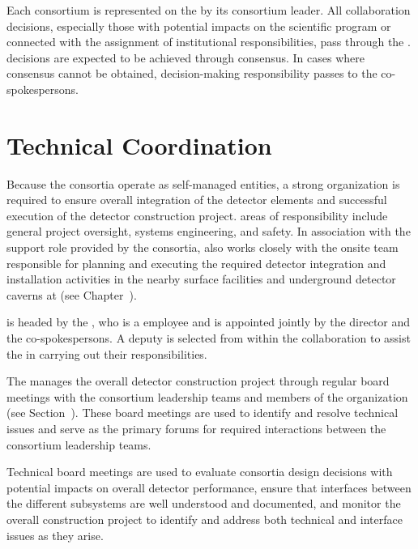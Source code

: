 Each consortium is represented on the   by its 
consortium leader.  All collaboration decisions, especially those with potential 
impacts on the  scientific program or connected with the assignment 
of institutional responsibilities, pass through the .   
decisions are expected to be achieved through consensus.  In cases where consensus 
cannot be obtained, decision-making responsibility passes to the co-spokespersons.

\section{Technical Coordination}
\label{sec:tc}

Because the consortia operate as self-managed entities, a strong
 organization is required to ensure overall integration 
of the detector elements and successful execution of the detector
construction project.   areas of responsibility include 
general project oversight, systems engineering,  
and safety.  In association with the support role provided by 
the consortia,  also works closely with the onsite 
team responsible for planning and executing the required 
detector integration and installation activities in the nearby 
surface facilities and underground detector caverns at  
(see Chapter~\label{ch:tc-jpo}).  

 is headed by the , who is a 
employee and is appointed jointly by the  director and 
the  co-spokespersons.  A deputy  
is selected from within the collaboration to assist the  
in carrying out their responsibilities.

The  manages the overall detector construction project
through regular board meetings with the consortium leadership teams and 
members of the  organization (see Section~\label{sec:tco}).  
These board meetings are used to identify and resolve technical issues
and serve as the primary forums for required interactions between the 
consortium leadership teams.

Technical board meetings are used to evaluate consortia design
decisions with potential impacts on overall detector performance,
ensure that interfaces between the different subsystems are well
understood and documented, and monitor the overall construction
project to identify and address both technical and interface issues 
as they arise.

